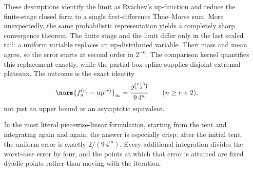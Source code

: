 \documentclass[11pt,oneside]{article}
\theoremstyle{definition}
\theoremstyle{remark}
\newcommand{\Up}{\operatorname{up}}
\begin{document}
These descriptions identify the limit as Rvachev's up-function and reduce the finite-stage
closed form to a single first-difference Thue--Morse sum.  More unexpectedly, the same
probabilistic representation yields a completely sharp convergence theorem.  The finite
stage and the limit differ only in the last scaled tail: a uniform variable replaces an
up-distributed variable.  Their mass and mean agree, so the error starts at second order in
$2^{-n}$.  The comparison kernel quantifies this replacement exactly, while the partial
box spline supplies disjoint extremal plateaux.  The outcome is the exact identity
\[
 \norm{f_n^{(r)}-\Up^{(r)}}_\infty
 =\frac{2^{\binom{r+3}{2}}}{9\,4^n}
 \qquad(n\ge r+2),
\]
not just an upper bound or an asymptotic equivalent.

In the most literal piecewise-linear formulation, starting from the tent and integrating
again and again, the answer is especially crisp: after the initial tent, the uniform error
is exactly $2/(9\,4^m)$.  Every additional integration divides the worst-case error by four,
and the points at which that error is attained are fixed dyadic points rather than moving
with the iteration.
\end{document}
